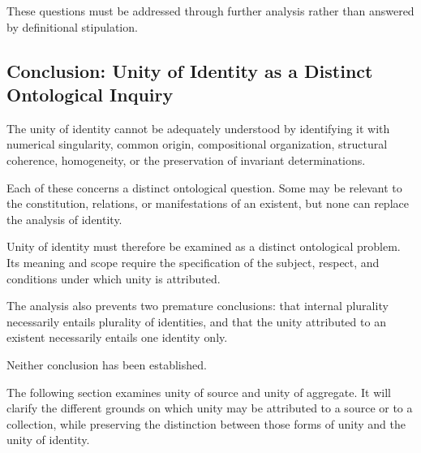 These questions must be addressed through further
analysis rather than answered by definitional
stipulation.

\subsection{Conclusion: Unity of Identity as a Distinct Ontological Inquiry}

The unity of identity cannot be adequately
understood by identifying it with numerical
singularity, common origin, compositional
organization, structural coherence, homogeneity,
or the preservation of invariant determinations.

Each of these concerns a distinct ontological
question. Some may be relevant to the constitution,
relations, or manifestations of an existent,
but none can replace the analysis of identity.

Unity of identity must therefore be examined
as a distinct ontological problem. Its meaning
and scope require the specification of the
subject, respect, and conditions under which
unity is attributed.

The analysis also prevents two premature conclusions:
that internal plurality necessarily entails
plurality of identities, and that the unity
attributed to an existent necessarily entails
one identity only.

Neither conclusion has been established.

The following section examines unity of source
and unity of aggregate. It will clarify the
different grounds on which unity may be attributed
to a source or to a collection, while preserving
the distinction between those forms of unity
and the unity of identity.

